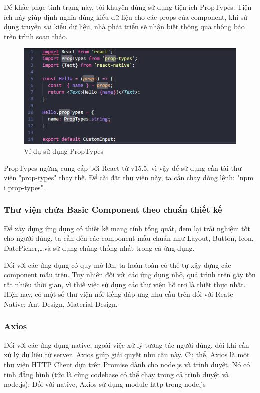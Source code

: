     Để khắc phục tình trạng này, tôi khuyên dùng sử dụng tiện ích PropTypes. Tiện ích này giúp định nghĩa đúng kiểu dữ liệu cho các props của component, khi sử dụng truyền sai kiểu dữ liệu, nhà phát triển sẽ nhận biết thông qua thông báo trên trình soạn thảo.
    \begin{figure}[!ht]
        \centering
        \includegraphics[width=1\textwidth]{images/propTypes.png}
        \caption{Ví dụ sử dụng PropTypes}
    \end{figure}
    
    PropTypes ngừng cung cấp bởi React từ v15.5, vì vậy để sử dụng cần tài thư viện "prop-types" thay thế. Để cài đặt thư viện này, ta cần chạy dòng lệnh: "npm i prop-types".

    \subsubsection{Thư viện chứa Basic Component theo chuẩn thiết kế}
    Để xây dựng ứng dụng có thiết kế mang tính tổng quát, đem lại trải nghiệm tốt cho người dùng, ta cần đến các component mẫu chuẩn như Layout, Button, Icon, DatePicker,\dots và sử dụng chúng thống nhất trong cả ứng dụng.

    Đối với các ứng dụng có quy mô lớn, ta hoàn toàn có thể tự xậy dựng các component mẫu trên. Tuy nhiên đối với các ứng dụng nhỏ, quá trình trên gây tốn rất nhiều thời gian, vì thiế việc sử dụng các thư viện hỗ trợ là thiết thực nhất. Hiện nay, có một số thư viện nổi tiếng đáp ưng nhu cầu trên đối với Reatc Native: Ant Design, Material Design.

    \subsubsection{Axios}
    Đối với các ứng dụng native, ngoài việc xử lý tương tác người dùng, đôi khi cần xử lý dữ liệu từ server. Axios giúp giải quyết nhu cầu này. Cụ thể, Axios là một thư viện HTTP Client dựa trên Promise dành cho node.js và trình duyệt. Nó có tính đẳng hình (tức là cùng codebase có thể chạy trong cả trình duyệt và node.js). Đối với native, Axios sử dụng module http trong node.js

